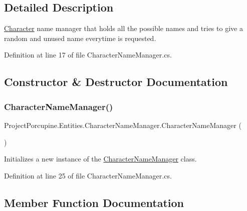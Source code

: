 \subsection{Detailed Description}
\hyperlink{class_project_porcupine_1_1_entities_1_1_character}{Character} name manager that holds all the possible names and tries to give a random and unused name everytime is requested. 



Definition at line 17 of file Character\+Name\+Manager.\+cs.



\subsection{Constructor \& Destructor Documentation}
\mbox{\label{class_project_porcupine_1_1_entities_1_1_character_name_manager_a92c82c6cf338443c6c2bd7a40aefc484}} 
\subsubsection{\texorpdfstring{Character\+Name\+Manager()}{CharacterNameManager()}}
{\footnotesize\ttfamily Project\+Porcupine.\+Entities.\+Character\+Name\+Manager.\+Character\+Name\+Manager (\begin{DoxyParamCaption}{ }\end{DoxyParamCaption})}



Initializes a new instance of the \hyperlink{class_project_porcupine_1_1_entities_1_1_character_name_manager}{Character\+Name\+Manager} class. 



Definition at line 25 of file Character\+Name\+Manager.\+cs.



\subsection{Member Function Documentation}
\mbox{\label{class_project_porcupine_1_1_entities_1_1_character_name_manager_a68badf7451947de52b682c44cc8b2dfd}} 
